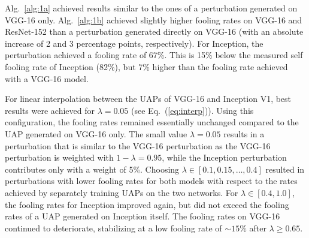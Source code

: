 \documentclass[runningheads]{llncs}
\begin{document}
Alg.~\ref{alg:1a} achieved results similar to the ones of a perturbation generated on VGG-16 only. Alg.~\ref{alg:1b} achieved slightly higher fooling rates on VGG-16 and ResNet-152 than a perturbation generated directly on VGG-16 (with an absolute increase of 2 and 3 percentage points, respectively). For Inception, the perturbation achieved a fooling rate of 67\%. This is 15\% below the measured self fooling rate of Inception (82\%), but 7\% higher than the fooling rate achieved with a VGG-16 model. 

For linear interpolation between the UAPs of VGG-16 and Inception V1, best results were achieved for \(\lambda=0.05\) (see Eq.~(\ref{eq:interp})). Using this configuration, the fooling rates remained essentially unchanged compared to the UAP generated on VGG-16 only.
The small value \(\lambda=0.05\) results in a perturbation that is similar to the VGG-16 perturbation as the VGG-16 perturbation is weighted with \(1-\lambda=0.95\), while the Inception perturbation contributes only with a weight of 5\%. Choosing \(\lambda\in\left[0.1,0.15,\ldots,0.4\right]\) resulted in perturbations with lower fooling rates for both models with respect to the rates achieved by separately training UAPs on the two networks. For \(\lambda \in\left[0.4,1.0\right]\), the fooling rates for Inception improved again, but did not exceed the fooling rates of a UAP generated on Inception itself. The fooling rates on VGG-16 continued to deteriorate, stabilizing at a low fooling rate of \(\sim 15\%\) after \(\lambda\geq 0.65\).
\end{document}
